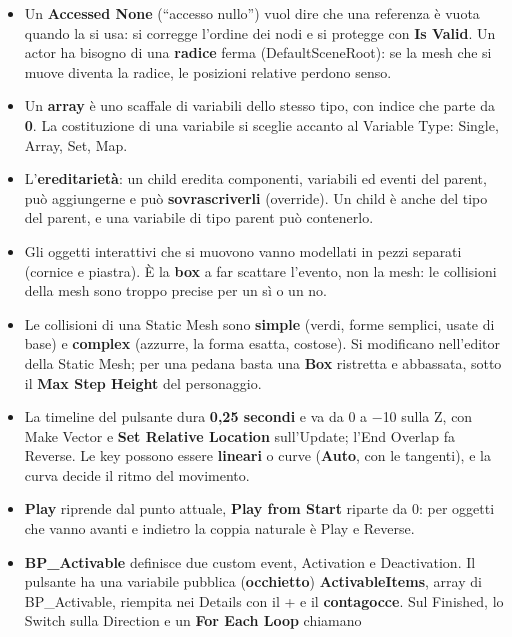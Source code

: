 \begin{itemize}
  \item Un \textbf{Accessed None} (``accesso nullo'') vuol dire che una referenza è
        vuota quando la si usa: si corregge l'ordine dei nodi e si protegge con
        \textbf{Is Valid}. Un actor ha bisogno di una \textbf{radice} ferma
        (DefaultSceneRoot): se la mesh che si muove diventa la radice, le posizioni
        relative perdono senso.
  \item Un \textbf{array} è uno scaffale di variabili dello stesso tipo, con indice che
        parte da \textbf{0}. La costituzione di una variabile si sceglie accanto al
        Variable Type: Single, Array, Set, Map.
  \item L'\textbf{ereditarietà}: un child eredita componenti, variabili ed eventi del
        parent, può aggiungerne e può \textbf{sovrascriverli} (override). Un child è
        anche del tipo del parent, e una variabile di tipo parent può contenerlo.
  \item Gli oggetti interattivi che si muovono vanno modellati in pezzi separati (cornice
        e piastra). È la \textbf{box} a far scattare l'evento, non la mesh: le collisioni
        della mesh sono troppo precise per un sì o un no.
  \item Le collisioni di una Static Mesh sono \textbf{simple} (verdi, forme semplici,
        usate di base) e \textbf{complex} (azzurre, la forma esatta, costose). Si
        modificano nell'editor della Static Mesh; per una pedana basta una \textbf{Box}
        ristretta e abbassata, sotto il \textbf{Max Step Height} del personaggio.
  \item La timeline del pulsante dura \textbf{0,25 secondi} e va da 0 a $-$10 sulla Z,
        con Make Vector e \textbf{Set Relative Location} sull'Update; l'End Overlap fa
        Reverse. Le key possono essere \textbf{lineari} o curve (\textbf{Auto}, con le
        tangenti), e la curva decide il ritmo del movimento.
  \item \textbf{Play} riprende dal punto attuale, \textbf{Play from Start} riparte da 0:
        per oggetti che vanno avanti e indietro la coppia naturale è Play e Reverse.
  \item \textbf{BP\_Activable} definisce due custom event, Activation e Deactivation.
        Il pulsante ha una variabile pubblica (\textbf{occhietto}) \textbf{ActivableItems},
        array di BP\_Activable, riempita nei Details con il + e il \textbf{contagocce}.
        Sul Finished, lo Switch sulla Direction e un \textbf{For Each Loop} chiamano

\end{itemize}
